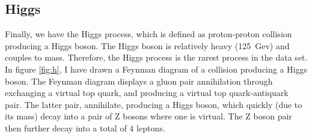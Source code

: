 \subsection*{Higgs}
Finally, we have the Higgs process, which is defined as proton-proton collision producing a Higgs boson. The Higgs boson is relatively heavy (125~Gev) and couples to mass. Therefore, the 
Higgs process is the rarest process in the data set. In figure \ref{fig:h}, I have drawn a Feynman diagram of a collision producing a Higgs boson. The Feynman diagram displays a gluon pair annihilation
through exchanging a virtual top quark, and producing a virtual top quark-antiquark pair. The latter pair, annihilate, producing a Higgs boson, which quickly (due to its mass) decay into a 
pair of Z bosons where one is virtual. The Z boson pair then further decay into a total of 4 leptons. 

